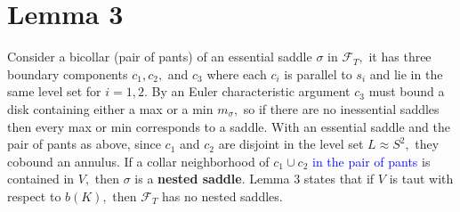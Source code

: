 \documentclass[11pt, oneside]{article}
\begin{document}
\section*{Lemma 3}
Consider a bicollar (pair of pants) of an essential saddle $\sigma$ in $\mathcal{F}_{T},$ it has three boundary components $c_{1}, c_{2},$ and $c_{3}$ where each $c_{i}$ is parallel to $s_{i}$ and lie in the same level set  for $i = 1, 2$. By an Euler characteristic argument $c_{3}$ must bound a disk containing either a max or a min $m_{\sigma},$ so if there are no inessential saddles then every max or min corresponds to a saddle. \newline \newline
With an essential saddle and the pair of pants as above, since $c_{1}$ and $c_{2}$ are disjoint in the level set $L \approx S^{2},$ they cobound an annulus. If a collar neighborhood of $c_{1} \cup c_{2}$ \textcolor{blue}{in the pair of pants} is contained in $V,$ then $\sigma$ is a \textbf{nested saddle}. 
\newline \newline Lemma 3 states that if $V$ is taut with respect to $b(K),$ then $\mathcal{F}_{T}$ has no nested saddles.
\end{document}
